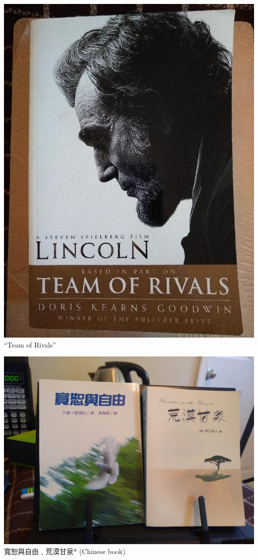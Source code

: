 \documentclass[t]{beamer}
\newcommand{\htarget}[2]{\hypertarget{#1}{#2}}
\begin{document}
\begin{frame}\htarget{lincoln}{} \begin{center}
\includegraphics[height=0.8\textheight]{Team_of_Rivals_mini.jpg} \\
``Team of Rivals''
\end{center} \end{frame}
\begin{frame}\htarget{forgive}{} \begin{center}
\includegraphics[height=0.8\textheight]{book01_mini.jpg} \\
寬恕與自由﹑荒漠甘泉* (Chinese book)
\end{center} \end{frame}
\end{document}
